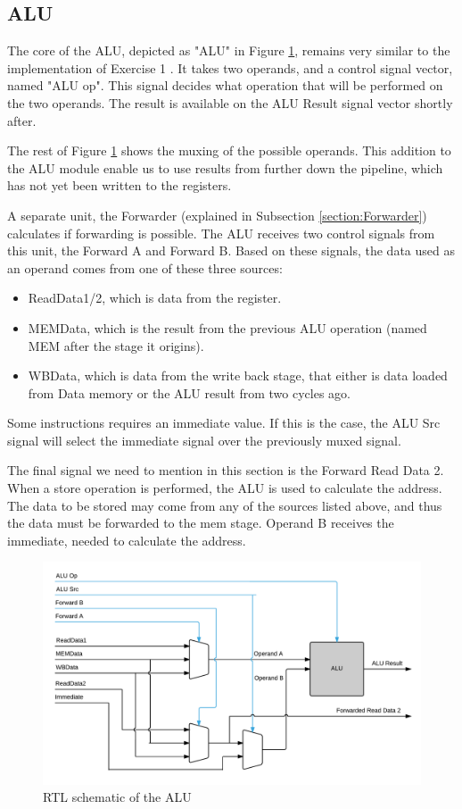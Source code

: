\subsection{ALU}
The core of the ALU, depicted as "ALU" in Figure \ref{fig:alu}, remains very similar to the implementation of Exercise 1 \cite{ex1report}. It takes two operands, and a control signal vector, named "ALU op". This signal decides what operation that will be performed on the two operands. The result is available on the ALU Result signal vector shortly after.

The rest of Figure \ref{fig:alu} shows the muxing of the possible operands. This addition to the ALU module enable us to use results from further down the pipeline, which has not yet been written to the registers.

A separate unit, the Forwarder (explained in Subsection \ref{section:Forwarder}) calculates if forwarding is possible. The ALU receives two control signals from this unit, the Forward A and Forward B.
Based on these signals, the data used as an operand comes from one of these three sources:
\begin{itemize}
\item ReadData1/2, which is data from the register.
\item MEMData, which is the result from the previous ALU operation (named MEM after the stage it origins).
\item WBData, which is data from the write back stage, that either is data loaded from Data memory or the ALU result from two cycles ago.
\end{itemize}
 
Some instructions requires an immediate value. If this is the case, the ALU Src signal will select the immediate signal over the previously muxed signal.

The final signal we need to mention in this section is the Forward Read Data 2. When a store operation is performed, the ALU is used to calculate the address. The data to be stored may come from any of the sources listed above, and thus the data must be forwarded to the mem stage. Operand B receives the immediate, needed to calculate the address.

\begin{figure}[h!]
    \includegraphics[width=\linewidth]{img/alu.png}
    \caption{RTL schematic of the ALU}
    \label{fig:alu}
\end{figure}

